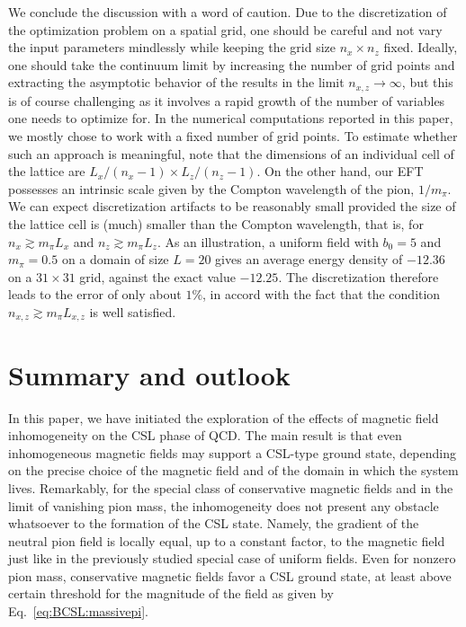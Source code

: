\documentclass[pdflatex,iicol,sn-mathphys-num]{sn-jnl}
\newcommand{\bmag}{b}%
\begin{document}
We conclude the discussion with a word of caution. Due to the discretization of the optimization problem on a spatial grid, one should be careful and not vary the input parameters mindlessly while keeping the grid size $n_x\times n_z$ fixed. Ideally, one should take the continuum limit by increasing the number of grid points and extracting the asymptotic behavior of the results in the limit $n_{x,z}\to\infty$, but this is of course challenging as it involves a rapid growth of the number of variables one needs to optimize for. In the numerical computations reported in this paper, we mostly chose to work with a fixed number of grid points. To estimate whether such an approach is meaningful, note that the dimensions of an individual cell of the lattice are $L_x/(n_x-1)\times L_z/(n_z-1)$. On the other hand, our EFT possesses an intrinsic scale given by the Compton wavelength of the pion, $1/m_\pi$. We can expect discretization artifacts to be reasonably small provided the size of the lattice cell is (much) smaller than the Compton wavelength, that is, for $n_x\gtrsim m_\pi L_x$ and $n_z\gtrsim m_\pi L_z$. As an illustration, a uniform field with $\bmag_{0} = 5$ and $m_{\pi} = 0.5$ on a domain of size $L = 20$ gives an average energy density of $-12.36$ on a $ 31 \times 31$ grid, against the exact value $-12.25$. The discretization therefore leads to the error of only about $1\%$, in accord with the fact that the condition $n_{x,z}\gtrsim m_\pi L_{x,z}$ is well satisfied.  


\section{Summary and outlook}
\label{sec:summary}

In this paper, we have initiated the exploration of the effects of magnetic field inhomogeneity on the CSL phase of QCD. The main result is that even inhomogeneous magnetic fields may support a CSL-type ground state, depending on the precise choice of the magnetic field and of the domain in which the system lives. Remarkably, for the special class of conservative magnetic fields and in the limit of vanishing pion mass, the inhomogeneity does not present any obstacle whatsoever to the formation of the CSL state. Namely, the gradient of the neutral pion field is locally equal, up to a constant factor, to the magnetic field just like in the previously studied special case of uniform fields. Even for nonzero pion mass, conservative magnetic fields favor a CSL ground state, at least above certain threshold for the magnitude of the field as given by Eq.~\eqref{eq:BCSL:massivepi}.
\end{document}
